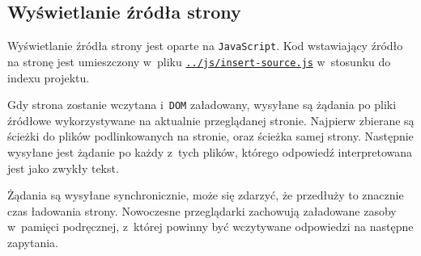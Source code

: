 \documentclass[10pt,a4paper]{article}
\newcommand{\f}[1]{\texttt{#1}}
\begin{document}
\subsection{Wyświetlanie źródła strony}
Wyświetlanie źródła strony jest oparte na \f{JavaScript}. Kod wstawiający źródło
na stronę jest umieszczony w~pliku
\f{\href{https://github.com/student-tomasz/pi-laboratoria/blob/master/js/insert-source.js}{../js/insert-source.js}}
w~stosunku do indexu projektu.

Gdy strona zostanie wczytana i~\f{DOM} załadowany, wysyłane są żądania po pliki
źródłowe wykorzystywane na aktualnie przeglądanej stronie. Najpierw zbierane są
ścieżki do plików podlinkowanych na stronie, oraz ścieżka samej strony.
Następnie wysyłane jest żądanie po każdy z~tych plików, którego odpowiedź
interpretowana jest jako zwykły tekst.

Żądania są wysyłane synchronicznie, może się zdarzyć, że przedłuży to znacznie
czas ładowania strony. Nowoczesne przeglądarki zachowują załadowane zasoby
w~pamięci podręcznej, z~której powinny być wczytywane odpowiedzi na następne
zapytania.
\end{document}
